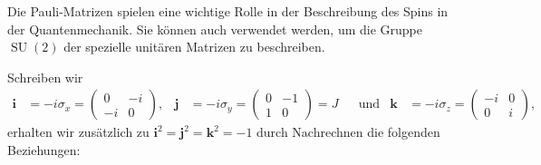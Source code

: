 Die Pauli-Matrizen spielen eine wichtige Rolle in der Beschreibung des
Spins in der Quantenmechanik.
%
%
Sie können auch verwendet werden, um die Gruppe $\operatorname{SU}(2)$ 
der spezielle unitären Matrizen zu beschreiben.
%

Schreiben wir
\begin{align}
\boldsymbol{i}
&=
-i\sigma_x
=
\begin{pmatrix}
0&-i\\
-i&0
\end{pmatrix}
,
&
\boldsymbol{j}
&=
-i\sigma_y
=
\begin{pmatrix}
0&-1\\
1&0
\end{pmatrix}
=
J
&&\text{und}
&
\boldsymbol{k}
&=
-i\sigma_z
=
\begin{pmatrix}
-i & 0 \\
 0 & i
\end{pmatrix}
,
\label{buch:komplex:zahlen:eqn:quaternionen}
\end{align}
erhalten wir zusätzlich zu
$\boldsymbol{i}^2
=
\boldsymbol{j}^2
=
\boldsymbol{k}^2
=-1$
durch Nachrechnen die folgenden Beziehungen:

